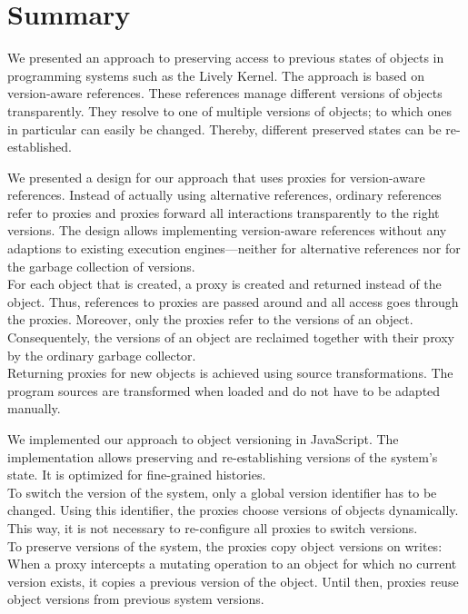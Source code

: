 \section{Summary} \label{chapter:SUMMARY}

We presented an approach to preserving access to previous states of objects in programming systems such as the Lively Kernel.
The approach is based on version-aware references.
These references manage different versions of objects transparently.
They resolve to one of multiple versions of objects; to which ones in particular can easily be changed.
Thereby, different preserved states can be re-established.

We presented a design for our approach that uses proxies for version-aware references.
Instead of actually using alternative references, ordinary references refer to proxies and proxies forward all interactions transparently to the right versions.
The design allows implementing version-aware references without any adaptions to existing execution engines---neither for alternative references nor for the garbage collection of versions.\\
For each object that is created, a proxy is created and returned instead of the object.
Thus, references to proxies are passed around and all access goes through the proxies.
Moreover, only the proxies refer to the versions of an object.
Consequentely, the versions of an object are reclaimed together with their proxy by the ordinary garbage collector.\\
Returning proxies for new objects is achieved using source transformations.
The program sources are transformed when loaded and do not have to be adapted manually.

We implemented our approach to object versioning in JavaScript.
The implementation allows preserving and re-establishing versions of the system's state.
It is optimized for fine-grained histories.\\
To switch the version of the system, only a global version identifier has to be changed.
Using this identifier, the proxies choose versions of objects dynamically.
This way, it is not necessary to re-configure all proxies to switch versions.\\
To preserve versions of the system, the proxies copy object versions on writes: When a proxy intercepts a mutating operation to an object for which no current version exists, it copies a previous version of the object.
Until then, proxies reuse object versions from previous system versions.

